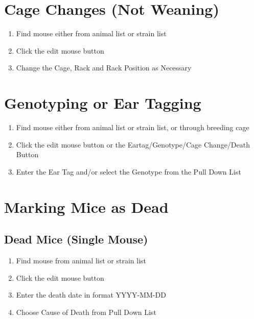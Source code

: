 \documentclass[letterpaper,10pt,english]{sphinxmanual}
\begin{document}
\section{Cage Changes (Not Weaning)}
\begin{enumerate}
\item {} 
Find mouse either from animal list or strain list

\item {} 
Click the edit mouse button

\item {} 
Change the Cage, Rack and Rack Position as Necessary

\end{enumerate}


\section{Genotyping or Ear Tagging}
\begin{enumerate}
\item {} 
Find mouse either from animal list or strain list, or through breeding cage

\item {} 
Click the edit mouse button or the Eartag/Genotype/Cage Change/Death Button

\item {} 
Enter the Ear Tag and/or select the Genotype from the Pull Down List

\end{enumerate}


\section{Marking Mice as Dead}


\subsection{Dead Mice (Single Mouse)}
\begin{enumerate}
\item {} 
Find mouse from animal list or strain list

\item {} 
Click the edit mouse button

\item {} 
Enter the death date in format YYYY-MM-DD

\item {} 
Choose Cause of Death from Pull Down List

\end{enumerate}
\end{document}
